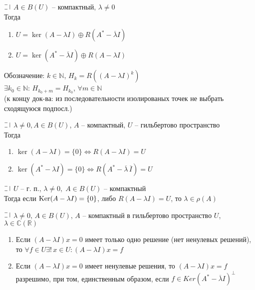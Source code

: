 \begin{lemma}[2]
  $\letus$ $A \in B(U)$ -- компактный, $\lambda \not = 0$\\
  Тогда\begin{minipage}[t]{0.8\linewidth}\begin{enumerate}[itemsep=1mm]
      \item $U = \ker(A -\lambda I) \oplus R(A^* - \overline{\lambda} I)$
      \item $U = \ker(A^* -\overline{\lambda}I) \oplus R(A - \lambda I)$
    \end{enumerate}\end{minipage}
\end{lemma}


\begin{lemma}[3]
  \noindent Обозначение: $k \in \mathbb{N}$, $H_k = R((A - \lambda I)^k)$ \\
  $\exists k_0 \in \mathbb{N}$: 
  $H_{k_0 + m} = H_{k_0}$, $\forall m \in \mathbb{N}$ \\
  (к концу док-ва: из последовательности изолированых точек не выбрать сходящуюся подпосл.)
\end{lemma}


\begin{lemma}[4]
  $\letus$ $\lambda \not = 0, A \in B(U)$, $A$ -- компактный, $U$ -- гильбертово пространство\\
  Тогда\begin{minipage}[t]{0.8\linewidth}\begin{enumerate}[itemsep=1mm]
      \item $\ker(A -\lambda I) = \{0\} \Leftrightarrow R(A - \lambda I) = U$
      \item $\ker(A^* -\lambda I) = \{0\} \Leftrightarrow R(A^* - \overline{\lambda}\,\overline{I}) = U$
      \end{enumerate}\end{minipage}
\end{lemma}

\begin{sled}
  $\letus$ $U$ -- г. п.,  $\lambda \ne  0, \; A \in B(U)$ -- компактный\\
  Тогда если $\text{Ker}(A -\lambda I) = \{0\}$, либо $R(A - \lambda I) = U$, то $\lambda \in \rho(A)$
\end{sled}

\begin{theorem}
  $\letus$ $\lambda \ne 0, \, A \in B(U), \, A$ -- компактный в гильбертово пространство $U$, $\lambda \in \mathbb{C}(\mathbb{R})$
  \begin{enumerate}
    \item Если $(A - \lambda I)x = 0$ имеет только одно решение (нет ненулевых решений), то 
    $\forall f \in U \exists! \, x \in U: (A - \lambda I)x = f$
    \item Если $(A - \lambda I)x = 0$ имеет ненулевые решения, то $(A - \lambda I)x = f$ разрешимо, при том, единственным образом, 
    если $f\in Ker(A^* - \overline{\lambda}I)^\perp$
  \end{enumerate}
\end{theorem}

